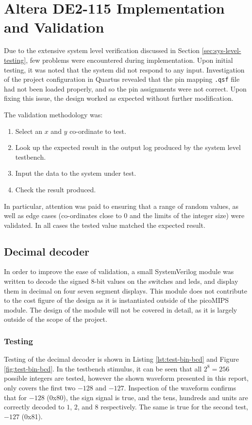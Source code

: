 \section{Altera DE2-115 Implementation and Validation} \label{sec:implementation}
Due to the extensive system level verification discussed in Section \ref{sec:sys-level-testing}, few problems were encountered during implementation. Upon initial testing, it was noted that the system did not respond to any input. Investigation of the project configuration in Quartus revealed that the pin mapping \texttt{.qsf} file had not been loaded properly, and so the pin assignments were not correct. Upon fixing this issue, the design worked as expected without further modification.

The validation methodology was:
\begin{enumerate}
	 \item Select an $x$ and $y$ co-ordinate to test.
	 \item Look up the expected result in the output log produced by the system level testbench.
	 \item Input the data to the system under test.
	 \item Check the result produced.
\end{enumerate}
In particular, attention was paid to ensuring that a range of random values, as well as edge cases (co-ordinates close to $0$ and the limits of the integer size) were validated. In all cases the tested value matched the expected result.


\subsection{Decimal decoder}
In order to improve the ease of validation, a small SystemVerilog module was written to decode the signed 8-bit values on the switches and \glspl{led}, and display them in decimal on four seven segment displays. This module does not contribute to the cost figure of the design as it is instantiated outside of the picoMIPS module. The design of the module will not be covered in detail, as it is largely outside of the scope of the project.

\subsubsection{Testing}
Testing of the decimal decoder is shown in Listing \ref{lst:test-bin-bcd} and Figure \ref{fig:test-bin-bcd}. In the testbench stimulus, it can be seen that all $2^8 = 256$ possible integers are tested, however the shown waveform presented in this report, only covers the first two $-128$ and $-127$. Inspection of the waveform confirms that for $-128$ (0x80), the sign signal is true, and the tens, hundreds and units are correctly decoded to $1$, $2$, and $8$ respectively. The same is true for the second test, $-127$ (0x81).

